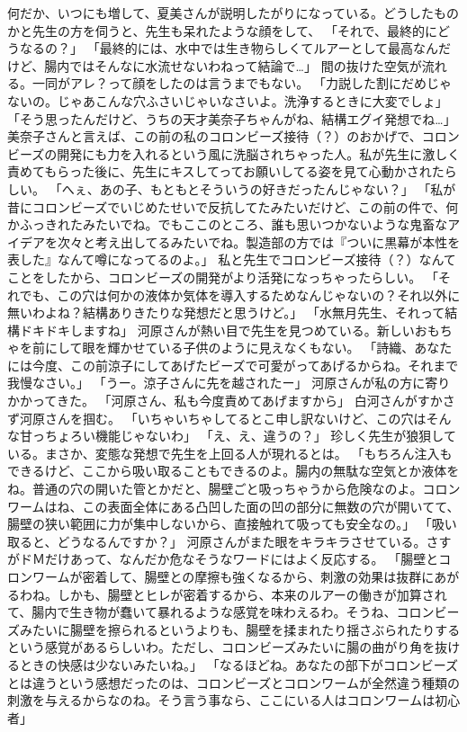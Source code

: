 何だか、いつにも増して、夏美さんが説明したがりになっている。どうしたものかと先生の方を伺うと、先生も呆れたような顔をして、
「それで、最終的にどうなるの？」
「最終的には、水中では生き物らしくてルアーとして最高なんだけど、腸内ではそんなに水流せないわねって結論で…」
間の抜けた空気が流れる。一同がアレ？って顔をしたのは言うまでもない。
「力説した割にだめじゃないの。じゃあこんな穴ふさいじゃいなさいよ。洗浄するときに大変でしょ」
「そう思ったんだけど、うちの天才美奈子ちゃんがね、結構エグイ発想でね…」
美奈子さんと言えば、この前の私のコロンビーズ接待（？）のおかげで、コロンビーズの開発にも力を入れるという風に洗脳されちゃった人。私が先生に激しく責めてもらった後に、先生にキスしてってお願いしてる姿を見て心動かされたらしい。
「へぇ、あの子、もともとそういうの好きだったんじゃない？」
「私が昔にコロンビーズでいじめたせいで反抗してたみたいだけど、この前の件で、何かふっきれたみたいでね。でもここのところ、誰も思いつかないような鬼畜なアイデアを次々と考え出してるみたいでね。製造部の方では『ついに黒幕が本性を表した』なんて噂になってるのよ。」
私と先生でコロンビーズ接待（？）なんてことをしたから、コロンビーズの開発がより活発になっちゃったらしい。
「それでも、この穴は何かの液体か気体を導入するためなんじゃないの？それ以外に無いわよね？結構ありきたりな発想だと思うけど。」
「水無月先生、それって結構ドキドキしますね」
河原さんが熱い目で先生を見つめている。新しいおもちゃを前にして眼を輝かせている子供のように見えなくもない。
「詩織、あなたには今度、この前涼子にしてあげたビーズで可愛がってあげるからね。それまで我慢なさい。」
「うー。涼子さんに先を越されたー」
河原さんが私の方に寄りかかってきた。
「河原さん、私も今度責めてあげますから」
白河さんがすかさず河原さんを掴む。
「いちゃいちゃしてるとこ申し訳ないけど、この穴はそんな甘っちょろい機能じゃないわ」
「え、え、違うの？」
珍しく先生が狼狽している。まさか、変態な発想で先生を上回る人が現れるとは。
「もちろん注入もできるけど、ここから吸い取ることもできるのよ。腸内の無駄な空気とか液体をね。普通の穴の開いた管とかだと、腸壁ごと吸っちゃうから危険なのよ。コロンワームはね、この表面全体にある凸凹した面の凹の部分に無数の穴が開いてて、腸壁の狭い範囲に力が集中しないから、直接触れて吸っても安全なの。」
「吸い取ると、どうなるんですか？」
河原さんがまた眼をキラキラさせている。さすがドＭだけあって、なんだか危なそうなワードにはよく反応する。
「腸壁とコロンワームが密着して、腸壁との摩擦も強くなるから、刺激の効果は抜群にあがるわね。しかも、腸壁とヒレが密着するから、本来のルアーの働きが加算されて、腸内で生き物が蠢いて暴れるような感覚を味わえるわ。そうね、コロンビーズみたいに腸壁を擦られるというよりも、腸壁を揉まれたり揺さぶられたりするという感覚があるらしいわ。ただし、コロンビーズみたいに腸の曲がり角を抜けるときの快感は少ないみたいね。」
「なるほどね。あなたの部下がコロンビーズとは違うという感想だったのは、コロンビーズとコロンワームが全然違う種類の刺激を与えるからなのね。そう言う事なら、ここにいる人はコロンワームは初心者」



